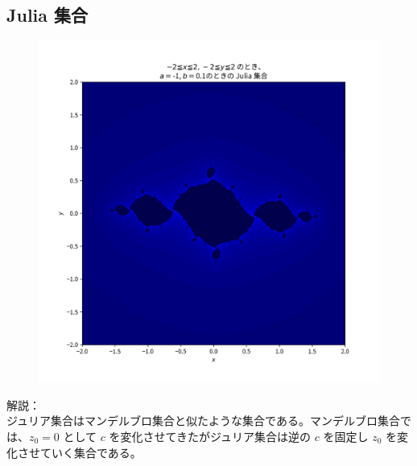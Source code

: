 \subsection{Julia 集合}
\begin{figure}[htbp]
  \centering
  \includegraphics[keepaspectratio, scale=0.8]{images/OtherProblem/ctest5_2.png}
\end{figure}
解説：\\
ジュリア集合はマンデルブロ集合と似たような集合である。マンデルブロ集合では、$z_0 = 0$ として $c$ を変化させてきたがジュリア集合は逆の $c$ を固定し $z_0$ を変化させていく集合である。\\
